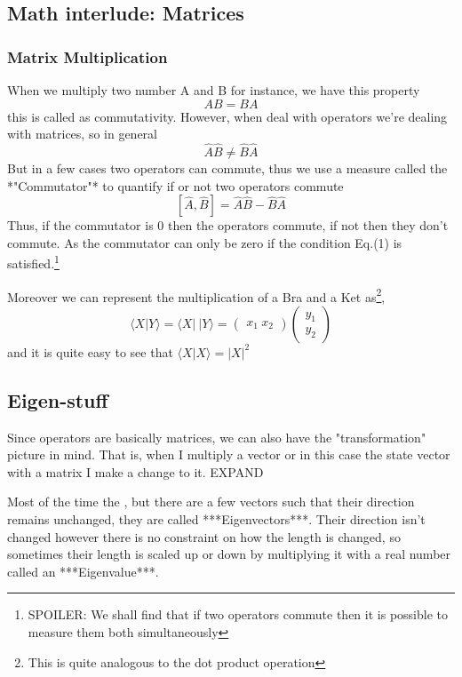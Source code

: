 \documentclass[]{article}
\begin{document}
\subsection{Math interlude: Matrices}

\subsubsection{Matrix Multiplication}

When we multiply two number A and B for instance, we have this property
$$AB = BA$$
this is called as commutativity. However, when deal with operators we're dealing with matrices, so in general
$$\hat{A}\hat{B} \neq \hat{B}\hat{A}$$
But in a few cases two operators can commute, thus we use a measure called the *"Commutator"* to quantify if or not two operators commute
$$[\hat{A}, \hat{B}] = \hat{A}\hat{B} - \hat{B}\hat{A}$$
Thus, if the commutator is 0 then the operators commute, if not then they don't commute. As the commutator can only be zero if the condition Eq.(1) is satisfied.\footnote{SPOILER: We shall find that if two operators commute then it is possible to measure them both simultaneously}

Moreover we can represent the multiplication of a Bra and a Ket as\footnote{This is quite analogous to the dot product operation},
$$\langle X|Y \rangle = \langle X | \  |Y\rangle = \begin{pmatrix}
x_1 \ x_2
\end{pmatrix} \begin{pmatrix}
y_1 \\
y_2
\end{pmatrix}$$
and it is quite easy to see that
$\langle X | X \rangle = |X|^2$

\subsection{Eigen-stuff}

Since operators are basically matrices, we can also have the "transformation" picture in mind. That is, when I multiply a vector or in this case the state vector with a matrix I make a change to it. EXPAND

Most of the time the , but there are a few vectors such that their direction remains unchanged, they are called ***Eigenvectors***. Their direction isn't changed however there is no constraint on how the length is changed, so sometimes their length is scaled up or down by multiplying it with a real number called an ***Eigenvalue***. 
\end{document}
